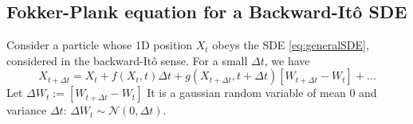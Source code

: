 \subsection{Fokker-Plank equation for a Backward-Itô SDE}
Consider a particle whose 1D position $X_t$ obeys the SDE \eqref{eq:generalSDE}, considered in the backward-Itô sense. For a small $\Delta t$, we have
\begin{equation}
	X_{t+\Delta t} = X_t + f(X_t,t) \Delta t + g(X_{t+\Delta t},t+\Delta t)[W_{t+\Delta t}-W_t] + \dots
\end{equation}
Let $\Delta W_t := [W_{t+\Delta t}-W_t]$ It is a gaussian random variable of mean $0$ and variance $\Delta t$: $\Delta W_t \sim \mathcal{N}(0,\Delta t)$. 
